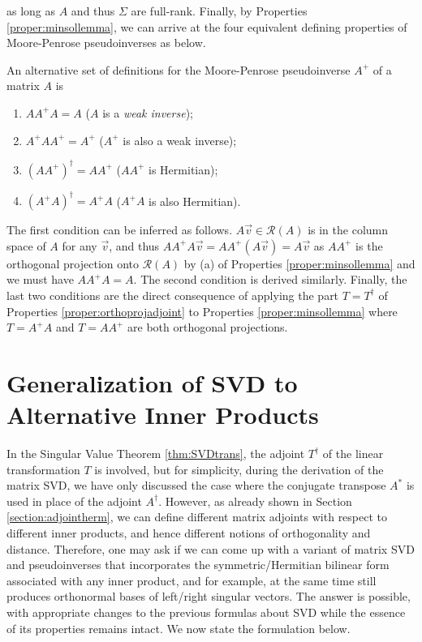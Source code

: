 as long as $A$ and thus $\Sigma$ are full-rank. Finally, by Properties \ref{proper:minsollemma}, we can arrive at the four equivalent defining properties of Moore-Penrose pseudoinverses as below.
\begin{proper}
\label{proper:pinvequiv}
An alternative set of definitions for the Moore-Penrose pseudoinverse $A^+$ of a matrix $A$ is
\begin{enumerate}
    \item $AA^+A = A$ ($A$ is a \textit{weak inverse});
    \item $A^+AA^+ = A^+$ ($A^+$ is also a weak inverse);
    \item $(AA^+)^\dag = AA^+$ ($AA^+$ is Hermitian);
    \item $(A^+A)^\dag = A^+A$ ($A^+A$ is also Hermitian).
\end{enumerate}
\end{proper}
The first condition can be inferred as follows. $A\vec{v} \in \mathcal{R}(A)$ is in the column space of $A$ for any $\vec{v}$, and thus $AA^+A\vec{v} = AA^+(A\vec{v}) = A\vec{v}$ as $AA^+$ is the orthogonal projection onto $\mathcal{R}(A)$ by (a) of Properties \ref{proper:minsollemma} and we must have $AA^+A = A$. The second condition is derived similarly. Finally, the last two conditions are the direct consequence of applying the part $T = T^\dag$ of Properties \ref{proper:orthoprojadjoint} to Properties \ref{proper:minsollemma} where $T = A^+A$ and $T= AA^+$ are both orthogonal projections.

\section{Generalization of SVD to Alternative Inner Products}
\label{section:SVDgeneral}

In the Singular Value Theorem \ref{thm:SVDtrans}, the adjoint $T^\dag$ of the linear transformation $T$ is involved, but for simplicity, during the derivation of the matrix SVD, we have only discussed the case where the conjugate transpose $A^*$ is used in place of the adjoint $A^\dag$. However, as already shown in Section \ref{section:adjointherm}, we can define different matrix adjoints with respect to different inner products, and hence different notions of orthogonality and distance. Therefore, one may ask if we can come up with a variant of matrix SVD and pseudoinverses that incorporates the symmetric/Hermitian bilinear form associated with any inner product, and for example, at the same time still produces orthonormal bases of left/right singular vectors. The answer is possible, with appropriate changes to the previous formulas about SVD while the essence of its properties remains intact. We now state the formulation below.

